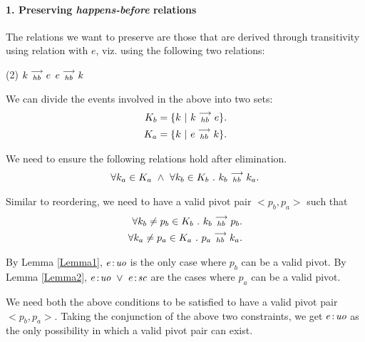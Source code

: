 \paragraph{1. Preserving \emph{happens-before} relations}
        The relations we want to preserve are those that are derived through transitivity using relation with $e$, viz. using the following two relations:
        \begin{tasks}(2)
            \task $k\stackrel{\longrightarrow}{_{hb}}e$
            \task $e\stackrel{\longrightarrow}{_{hb}}k$
        \end{tasks}

        We can divide the events involved in the above into two sets:
        \begin{align*}
            K_b = \{k \ | \ k\stackrel{\longrightarrow}{_{hb}}e \}. \\
            K_a = \{k \ | \ e\stackrel{\longrightarrow}{_{hb}}k \}. 
        \end{align*}

        We need to ensure the following relations hold after elimination.
        \begin{align*}
            \forall k_a \in K_a \ \wedge \ \forall k_b \in K_b \ . \ \reln{k_b}{hb}{k_a}.
        \end{align*}

        Similar to reordering, we need to have a valid pivot pair $<p_b, p_a>$ such that 
        \begin{align*}
            \forall k_b \neq p_b \in K_b \ . \ k_b\stackrel{\longrightarrow}{_{hb}}p_b. \\
            \forall k_a \neq p_a \in K_a \ . \ p_a\stackrel{\longrightarrow}{_{hb}}k_a. 
        \end{align*}

        By Lemma \ref{Lemma1}, $e\!:\!\textit{uo}$ is the only case where $p_b$ can be a valid pivot. 
        By Lemma \ref{Lemma2}, $e\!:\!\textit{uo} \ \vee \ e\!:\!\textit{sc}$ are the cases where $p_a$ can be a valid pivot. 
        
        We need both the above conditions to be satisfied to have a valid pivot pair $<p_b, p_a>$. 
        Taking the conjunction of the above two constraints, we get $e\!:\!\textit{uo}$ as the only possibility in which a valid pivot pair can exist. 
